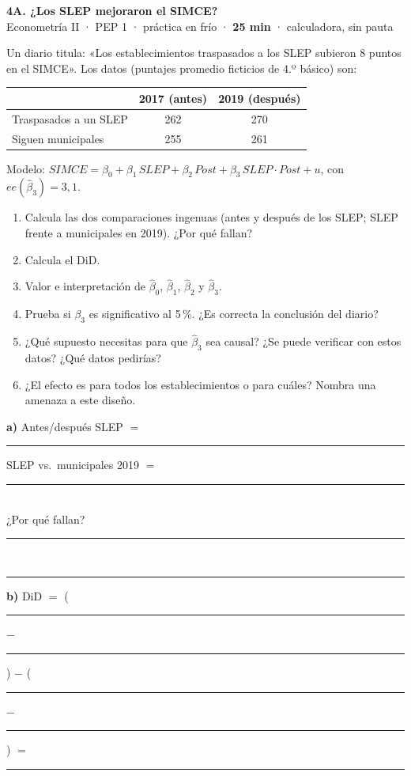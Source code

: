 \documentclass[11pt,a4paper]{article}
\begin{document}
\begin{center}
{\Large\bfseries 4A. ¿Los SLEP mejoraron el SIMCE?}\\[2pt]
Econometría II · PEP 1 · práctica en frío · \textbf{25 min} · calculadora, sin pauta
\end{center}

\noindent Un diario titula: «Los establecimientos traspasados a los SLEP subieron 8 puntos en el SIMCE». Los datos (puntajes promedio ficticios de 4.º básico) son:
\begin{center}
\renewcommand{\arraystretch}{1.3}
\begin{tabular}{lcc}\toprule
 & 2017 (antes) & 2019 (después)\\\midrule
Traspasados a un SLEP & 262 & 270\\
Siguen municipales & 255 & 261\\\bottomrule
\end{tabular}
\end{center}
Modelo: $SIMCE=\beta_0+\beta_1\,SLEP+\beta_2\,Post+\beta_3\,SLEP\cdot Post+u$, \quad con $ee(\hat\beta_3)=3{,}1$.

\begin{enumerate}[label=\alph*),itemsep=1pt]
\item Calcula las dos comparaciones ingenuas (antes y después de los SLEP; SLEP frente a municipales en 2019). ¿Por qué fallan?
\item Calcula el DiD.
\item Valor e interpretación de $\hat\beta_0$, $\hat\beta_1$, $\hat\beta_2$ y $\hat\beta_3$.
\item Prueba si $\beta_3$ es significativo al 5\,\%. ¿Es correcta la conclusión del diario?
\item ¿Qué supuesto necesitas para que $\hat\beta_3$ sea causal? ¿Se puede verificar con estos datos? ¿Qué datos pedirías?
\item ¿El efecto es para todos los establecimientos o para cuáles? Nombra una amenaza a este diseño.
\end{enumerate}

\medskip
\noindent\textbf{a)} Antes/después SLEP $=$ \rule{4cm}{0.4pt} \qquad SLEP vs.\ municipales 2019 $=$ \rule{3.5cm}{0.4pt}\\[8pt]
¿Por qué fallan? \rule{13cm}{0.4pt}\\[8pt]
\rule{15.4cm}{0.4pt}

\medskip
\noindent\textbf{b)} DiD $=$ (\rule{1.2cm}{0.4pt} $-$ \rule{1.2cm}{0.4pt}) $-$ (\rule{1.2cm}{0.4pt} $-$ \rule{1.2cm}{0.4pt}) $=$ \rule{2.5cm}{0.4pt}
\end{document}
